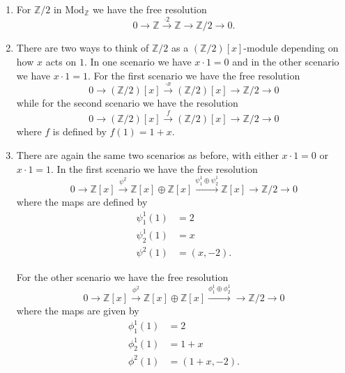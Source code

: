\documentclass[a4paper]{article}
\begin{document}
\begin{exercise}{3}
\begin{enumerate}
  \item For $ \mathbb{Z}/2 $ in $ \text{Mod}_{\mathbb{Z}} $ we have the free resolution
    \begin{equation*}
      0 \to \mathbb{Z} \xrightarrow{\cdot 2} \mathbb{Z} \to \mathbb{Z}/2 \to 0
    .\end{equation*}
  \item There are two ways to think of $ \mathbb{Z}/2 $ as a $ (\mathbb{Z}/2) [x] $-module depending on how $ x $ acts on $ 1 $. In one scenario we have $ x\cdot 1 = 0 $ and in the other scenario we have $ x \cdot 1 = 1 $. For the first scenario we have the free resolution
    \begin{equation*}
      0 \to (\mathbb{Z}/2)[x] \xrightarrow{\cdot x} (\mathbb{Z}/2)[x] \to \mathbb{Z}/2 \to 0
    \end{equation*}
    while for the second scenario we have the resolution
    \begin{equation*}
      0 \to (\mathbb{Z}/2)[x] \xrightarrow{f} (\mathbb{Z}/2)[x] \to \mathbb{Z}/2 \to 0
    \end{equation*}
    where $ f $ is defined by $ f(1) = 1 + x $.
  \item There are again the same two scenarios as before, with either $ x\cdot 1 = 0 $ or $ x \cdot 1 = 1 $. In the first scenario we have the free resolution
    \begin{equation*}
      0 \to \mathbb{Z}[x] \xrightarrow{\psi^2} \mathbb{Z}[x] \oplus \mathbb{Z}[x] \xrightarrow{\psi_1^{1}\oplus \psi_2^{1}} \mathbb{Z}[x] \to \mathbb{Z}/2 \to 0
    \end{equation*}
    where the maps are defined by
    \begin{align*}
      \psi_1^{1}(1) &= 2 \\
      \psi_2^{1}(1) &= x \\
      \psi^{2}(1) &= (x, -2)
    .\end{align*}

    For the other scenario we have the free resolution
    \begin{equation*}
      0 \to \mathbb{Z}[x] \xrightarrow{\phi^2} \mathbb{Z}[x] \oplus \mathbb{Z}[x] \xrightarrow{\phi_1^{1} \oplus \phi_2^{1}} \to \mathbb{Z}/2 \to 0
    \end{equation*}
    where the maps are given by
    \begin{align*}
      \phi_1^{1}(1) &= 2 \\
      \phi_2^{1}(1) &= 1 + x \\
      \phi^2(1) &= (1 + x, -2)
    .\end{align*}


\end{enumerate}
\end{exercise}
\end{document}
